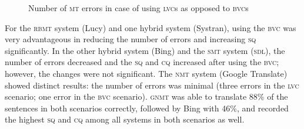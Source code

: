 \documentclass[output=paper]{langsci/langscibook}
\begin{document}
\begin{figure}[p]

    \caption{Number of \textsc{mt} errors in case of using 
\textsc{lvc}s as opposed to \textsc{bvc}s }
    \label{marzouk:fig4}
\end{figure}\pagebreak



For the \textsc{rbmt} system (Lucy) and one hybrid system (Systran), using the \textsc{bvc} was very advantageous in reducing the number of errors and increasing \textsc{sq} significantly. In the other hybrid system (Bing) and the \textsc{smt} system \textsc{(sdl)}, the number of errors decreased and the \textsc{sq} and \textsc{cq} increased after using the \textsc{bvc}; however, the changes were not significant. The \textsc{nmt} system (Google Translate) showed distinct results: the number of errors was minimal (three errors in the \textsc{lvc} scenario; one error in the \textsc{bvc} scenario). \textsc{gnmt} was able to translate 88\% of the sentences in both scenarios correctly, followed by Bing with 46\%, and recorded the highest \textsc{sq} and \textsc{cq} among all systems in both scenarios as well.
\end{document}
